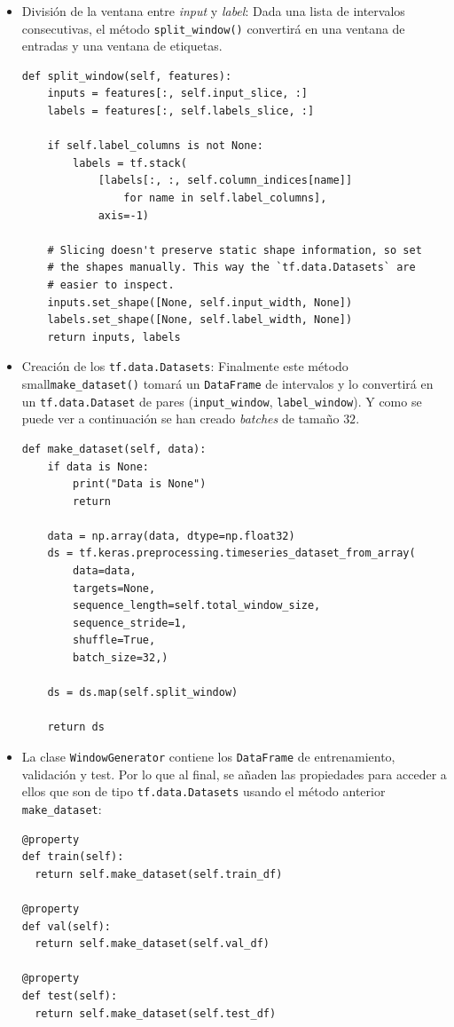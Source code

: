 \begin{itemize}
\item División de la ventana entre \textit{input} y \textit{label}: Dada una lista de intervalos consecutivas, el método \small{\verb|split_window()|} convertirá en una ventana de entradas y una ventana de etiquetas.

\begin{verbatim}
def split_window(self, features):
    inputs = features[:, self.input_slice, :]
    labels = features[:, self.labels_slice, :]

    if self.label_columns is not None:
        labels = tf.stack(
            [labels[:, :, self.column_indices[name]]
                for name in self.label_columns],
            axis=-1)

    # Slicing doesn't preserve static shape information, so set
    # the shapes manually. This way the `tf.data.Datasets` are
    # easier to inspect.
    inputs.set_shape([None, self.input_width, None])
    labels.set_shape([None, self.label_width, None])
    return inputs, labels
\end{verbatim}


\item Creación de los \small{\verb|tf.data.Datasets|}: Finalmente este método small{\verb|make_dataset()|} tomará un \small{\verb|DataFrame|} de intervalos y lo convertirá en un \small{\verb|tf.data.Dataset|} de pares (\small{\verb|input_window|}, \small{\verb|label_window|}). Y como se puede ver a continuación se han creado \textit{batches} de tamaño $32$.


\begin{verbatim}
def make_dataset(self, data):
    if data is None:
        print("Data is None")
        return

    data = np.array(data, dtype=np.float32)
    ds = tf.keras.preprocessing.timeseries_dataset_from_array(
        data=data,
        targets=None,
        sequence_length=self.total_window_size,
        sequence_stride=1,
        shuffle=True,
        batch_size=32,)

    ds = ds.map(self.split_window)

    return ds
\end{verbatim}

\item La clase \small{\verb|WindowGenerator|} contiene los \small{\verb|DataFrame|} de entrenamiento, validación y test. Por lo que al final, se añaden las propiedades para acceder a ellos que son de tipo \small{\verb|tf.data.Datasets|} usando el método anterior \small\verb|make_dataset|:
\begin{verbatim}
@property
def train(self):
  return self.make_dataset(self.train_df)

@property
def val(self):
  return self.make_dataset(self.val_df)

@property
def test(self):
  return self.make_dataset(self.test_df)
\end{verbatim}
\end{itemize}